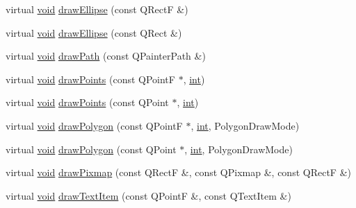 \begin{DoxyCompactItemize}
virtual \hyperlink{group___u_a_v_objects_plugin_ga444cf2ff3f0ecbe028adce838d373f5c}{void} \hyperlink{class_qwt_null_paint_device_1_1_paint_engine_a896c4997989fb95333ec681be4aa8909}{draw\-Ellipse} (const Q\-Rect\-F \&)
\item 
virtual \hyperlink{group___u_a_v_objects_plugin_ga444cf2ff3f0ecbe028adce838d373f5c}{void} \hyperlink{class_qwt_null_paint_device_1_1_paint_engine_a60ccddb86992e60b17deaf80300b9234}{draw\-Ellipse} (const Q\-Rect \&)
\item 
virtual \hyperlink{group___u_a_v_objects_plugin_ga444cf2ff3f0ecbe028adce838d373f5c}{void} \hyperlink{class_qwt_null_paint_device_1_1_paint_engine_a0d081acb69ea806bd7bc17332f547c40}{draw\-Path} (const Q\-Painter\-Path \&)
\item 
virtual \hyperlink{group___u_a_v_objects_plugin_ga444cf2ff3f0ecbe028adce838d373f5c}{void} \hyperlink{class_qwt_null_paint_device_1_1_paint_engine_aec60a425690e32212a51f680a067e0c6}{draw\-Points} (const Q\-Point\-F $\ast$, \hyperlink{ioapi_8h_a787fa3cf048117ba7123753c1e74fcd6}{int})
\item 
virtual \hyperlink{group___u_a_v_objects_plugin_ga444cf2ff3f0ecbe028adce838d373f5c}{void} \hyperlink{class_qwt_null_paint_device_1_1_paint_engine_a77360ea6c32a535483bdacb6c14649d1}{draw\-Points} (const Q\-Point $\ast$, \hyperlink{ioapi_8h_a787fa3cf048117ba7123753c1e74fcd6}{int})
\item 
virtual \hyperlink{group___u_a_v_objects_plugin_ga444cf2ff3f0ecbe028adce838d373f5c}{void} \hyperlink{class_qwt_null_paint_device_1_1_paint_engine_a621dedf24b4aee7af44aee556449d2d5}{draw\-Polygon} (const Q\-Point\-F $\ast$, \hyperlink{ioapi_8h_a787fa3cf048117ba7123753c1e74fcd6}{int}, Polygon\-Draw\-Mode)
\item 
virtual \hyperlink{group___u_a_v_objects_plugin_ga444cf2ff3f0ecbe028adce838d373f5c}{void} \hyperlink{class_qwt_null_paint_device_1_1_paint_engine_a865638252f17829b487109e665697ac8}{draw\-Polygon} (const Q\-Point $\ast$, \hyperlink{ioapi_8h_a787fa3cf048117ba7123753c1e74fcd6}{int}, Polygon\-Draw\-Mode)
\item 
virtual \hyperlink{group___u_a_v_objects_plugin_ga444cf2ff3f0ecbe028adce838d373f5c}{void} \hyperlink{class_qwt_null_paint_device_1_1_paint_engine_ae6cba5e6b43b63cbf5f0db284c18290c}{draw\-Pixmap} (const Q\-Rect\-F \&, const Q\-Pixmap \&, const Q\-Rect\-F \&)
\item 
virtual \hyperlink{group___u_a_v_objects_plugin_ga444cf2ff3f0ecbe028adce838d373f5c}{void} \hyperlink{class_qwt_null_paint_device_1_1_paint_engine_a5e569fedac36b887b8ecbdfd92b9772d}{draw\-Text\-Item} (const Q\-Point\-F \&, const Q\-Text\-Item \&)

\end{DoxyCompactItemize}
